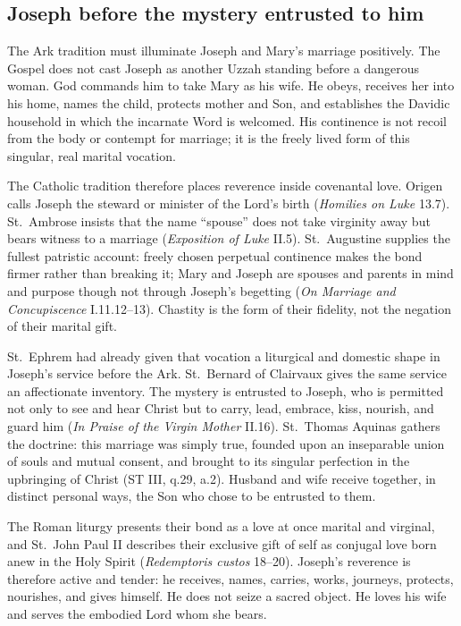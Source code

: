 \subsection{Joseph before the mystery entrusted to him}

The Ark tradition must illuminate Joseph and Mary's marriage positively. The
Gospel does not cast Joseph as another Uzzah standing before a dangerous woman.
God commands him to take Mary as his wife. He obeys, receives her into his home,
names the child, protects mother and Son, and establishes the Davidic household
in which the incarnate Word is welcomed. His continence is not recoil from the
body or contempt for marriage; it is the freely lived form of this singular,
real marital vocation.

The Catholic tradition therefore places reverence inside covenantal love.
Origen calls Joseph the steward or minister of the Lord's birth
(\emph{Homilies on Luke} 13.7). St.~Ambrose insists that the name ``spouse''
does not take virginity away but bears witness to a marriage
(\emph{Exposition of Luke} II.5). St.~Augustine supplies the fullest patristic
account: freely chosen perpetual continence makes the bond firmer rather than
breaking it; Mary and Joseph are spouses and parents in mind and purpose though
not through Joseph's begetting (\emph{On Marriage and Concupiscence}
I.11.12--13). Chastity is the form of their fidelity, not the negation of their
marital gift.

St.~Ephrem had already given that vocation a liturgical and domestic shape in
Joseph's service before the Ark. St.~Bernard of Clairvaux gives the same service
an affectionate inventory. The mystery is entrusted to Joseph, who is permitted
not only to see and hear Christ but to
carry, lead, embrace, kiss, nourish, and guard him (\emph{In Praise of the
Virgin Mother} II.16). St.~Thomas Aquinas gathers the doctrine: this marriage
was simply true, founded upon an inseparable union of souls and mutual consent,
and brought to its singular perfection in the upbringing of Christ (ST III,
q.29, a.2). Husband and wife receive together, in distinct personal ways, the
Son who chose to be entrusted to them.

The Roman liturgy presents their bond as a love at once marital and virginal,
and St.~John Paul II describes their exclusive gift of self as conjugal love born
anew in the Holy Spirit (\emph{Redemptoris custos} 18--20). Joseph's reverence
is therefore active and tender: he receives, names, carries, works, journeys,
protects, nourishes, and gives himself. He does not seize a sacred object. He
loves his wife and serves the embodied Lord whom she bears.

